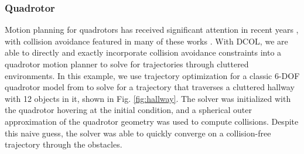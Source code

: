 \subsubsection{Quadrotor}
Motion planning for quadrotors has received significant attention in recent years \cite{mellinger2011,mellinger,sun2022}, with collision avoidance featured in many of these works \cite{falanga2020,penicka2022,shraim2018}. With DCOL, we are able to directly and exactly incorporate collision avoidance constraints into a quadrotor motion planner to solve for trajectories through cluttered environments. In this example, we use trajectory optimization for a classic 6-DOF quadrotor model from \cite{mellinger2011,jackson2020} to solve for a trajectory that traverses a cluttered hallway with 12 objects in it, shown in Fig. \ref{fig:hallway}. The solver was initialized with the quadrotor hovering at the initial condition, and a spherical outer approximation of the quadrotor geometry was used to compute collisions. Despite this naive guess, the solver was able to quickly converge on a collision-free trajectory through the obstacles. 
